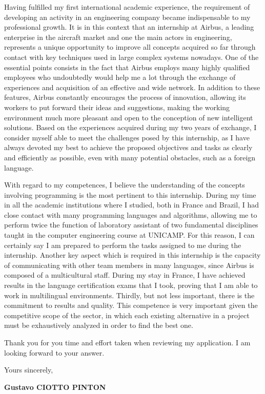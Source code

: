 \documentclass[12pt, a4paper]{article}
\begin{document}
\vspace{12pt}

Having fulfilled my first international academic experience, the requirement of
developing an activity in an engineering company became indispensable to my
professional growth. It is in this context that an internship at Airbus, a
leading enterprise in the aircraft market and one the main actors in
engineering, represents a unique opportunity to improve all concepts acquired
so far through contact with key techniques used in large complex systems
nowadays.  One of the essential points consists in the fact that Airbus employs
many highly qualified employees who undoubtedly would help me a lot through
the exchange of experiences and acquisition of an effective and wide
network. In addition  to these features, Airbus constantly encourages
the process of innovation, allowing its workers to put forward their ideas and
suggestions, making the working environment much more pleasant and open to the
conception of new intelligent solutions. Based on the experiences acquired
during my two years of exchange, I consider myself able to meet the challenges
posed by this internship, as I have always devoted my best to achieve the
proposed objectives and tasks as clearly and efficiently as possible, even with
many potential obstacles, such as a foreign language.


\vspace{12pt}

With regard to my competences,  I believe the understanding of the concepts
involving programming is the most pertinent to this internship. During my time
in all the academic institutions where I studied, both in France and Brazil, I
had close contact with many programming languages and algorithms, allowing me to perform
twice the function of laboratory assistant of two fundamental disciplines taught
in the computer engineering course at UNICAMP. For this reason, I can certainly
say I am prepared to perform the tasks assigned to me during the internship.
Another key aspect which is required in this internship is the capacity of
communicating with other team members in many languages, since Airbus is
composed of a multicultural staff. During my stay in France, I have achieved
results in the language certification exams that I took, proving
that I am able to work in multilingual environments. Thirdly, but not less
important, there is the commitment to results and quality. This competence is very important given
the competitive scope of the sector,  in which each existing alternative  in a
project must be exhaustively analyzed in order to find the best one.


	
\vspace{12pt}

Thank you for you time and effort taken when reviewing my application. I am
looking forward to your answer.

\vspace{12pt}

Yours sincerely,

\vspace{12pt}

\textbf{Gustavo CIOTTO PINTON}
\end{document}

